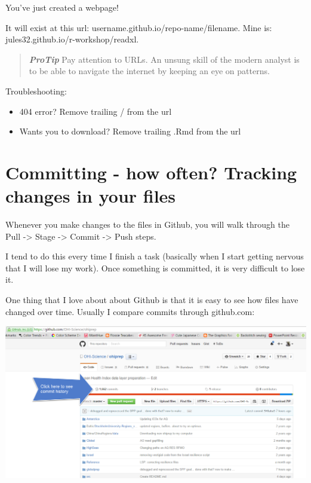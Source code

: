 \documentclass[]{book}
\providecommand{\tightlist}{%
  \setlength{\itemsep}{0pt}\setlength{\parskip}{0pt}}
\begin{document}
You've just created a webpage!

It will exist at this url: username.github.io/repo-name/filename. Mine is: jules32.github.io/r-workshop/readxl.

\begin{quote}
\textbf{\emph{ProTip}} Pay attention to URLs. An unsung skill of the modern analyst is to be able to navigate the internet by keeping an eye on patterns.
\end{quote}

Troubleshooting:

\begin{itemize}
\tightlist
\item
  404 error? Remove trailing / from the url
\item
  Wants you to download? Remove trailing .Rmd from the url
\end{itemize}

\hypertarget{committing---how-often-tracking-changes-in-your-files}{%
\section{Committing - how often? Tracking changes in your files}\label{committing---how-often-tracking-changes-in-your-files}}

Whenever you make changes to the files in Github, you will walk through the Pull -\textgreater{} Stage -\textgreater{} Commit -\textgreater{} Push steps.

I tend to do this every time I finish a task (basically when I start getting nervous that I will lose my work). Once something is committed, it is very difficult to lose it.

One thing that I love about about Github is that it is easy to see how files have changed over time. Usually I compare commits through github.com:

\includegraphics{img/commit_history.png}
\end{document}
